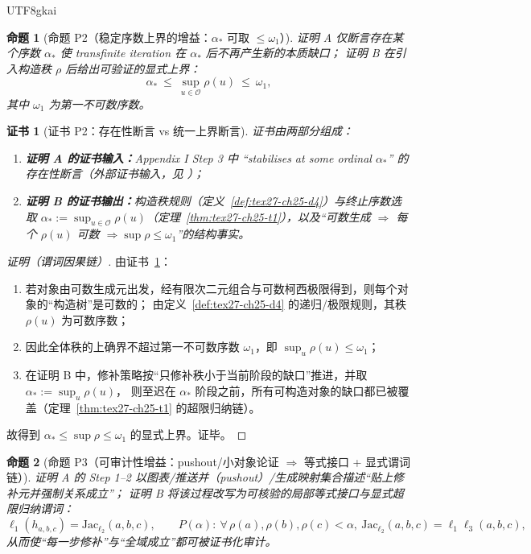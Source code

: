 \documentclass[12pt]{article}
\newtheorem{proposition}{命题}[section]
\newtheorem{Certificate}{证书}[section]
\begin{document}
\begin{CJK*}{UTF8}{gkai}
\begin{proposition}[命题 P2（稳定序数上界的增益：$\alpha_\ast$ 可取 $\le\omega_1$）]
\label{prop:tex27-ch26-p2}
证明 A 仅断言存在某个序数 $\alpha_\ast$ 使 transfinite iteration 在 $\alpha_\ast$ 后不再产生新的本质缺口；
证明 B 在引入构造秩 $\rho$ 后给出可验证的显式上界：
\[
  \alpha_\ast\ \le\ \sup_{u\in\mathcal{O}}\rho(u)\ \le\ \omega_1,
\]
其中 $\omega_1$ 为第一不可数序数。
\end{proposition}

\begin{Certificate}[证书 P2：存在性断言 vs 统一上界断言]
\label{cert:tex27-ch26-p2}
证书由两部分组成：
\begin{enumerate}
  \item \textbf{证明 A 的证书输入：}Appendix I Step 3 中 “stabilises at some ordinal $\alpha_\ast$” 的存在性断言（外部证书输入，见
    \cite{GaoZheng2025GFramework}）；
  \item \textbf{证明 B 的证书输出：}构造秩规则（定义~\ref{def:tex27-ch25-d4}）与终止序数选取
  $\alpha_\ast:=\sup_{u\in\mathcal{O}}\rho(u)$（定理~\ref{thm:tex27-ch25-t1}），以及“可数生成 $\Rightarrow$ 每个 $\rho(u)$ 可数
    $\Rightarrow \sup\rho\le\omega_1$”的结构事实。
\end{enumerate}
\end{Certificate}

\begin{proof}[证明（谓词因果链）]
由证书~\ref{cert:tex27-ch26-p2}：
\begin{enumerate}
  \item 若对象由可数生成元出发，经有限次二元组合与可数柯西极限得到，则每个对象的“构造树”是可数的；
  由定义~\ref{def:tex27-ch25-d4} 的递归/极限规则，其秩 $\rho(u)$ 为可数序数；
  \item 因此全体秩的上确界不超过第一不可数序数 $\omega_1$，即 $\sup_{u}\rho(u)\le\omega_1$；
  \item 在证明 B 中，修补策略按“只修补秩小于当前阶段的缺口”推进，并取 $\alpha_\ast:=\sup_u\rho(u)$，
  则至迟在 $\alpha_\ast$ 阶段之前，所有可构造对象的缺口都已被覆盖（定理~\ref{thm:tex27-ch25-t1} 的超限归纳链）。
\end{enumerate}
故得到 $\alpha_\ast\le \sup\rho\le\omega_1$ 的显式上界。证毕。
\end{proof}

\begin{proposition}[命题 P3（可审计性增益：pushout/小对象论证 $\Rightarrow$ 等式接口 + 显式谓词链）]
\label{prop:tex27-ch26-p3}
证明 A 的 Step 1--2 以图表/推送并（pushout）/生成映射集合描述“贴上修补元并强制关系成立”；
证明 B 将该过程改写为可核验的局部等式接口与显式超限归纳谓词：
\[
  \ell_1(h_{a,b,c})=\mathrm{Jac}_{\ell_2}(a,b,c),
  \qquad
  P(\alpha):\ \forall\,\rho(a),\rho(b),\rho(c)<\alpha,\
  \mathrm{Jac}_{\ell_2}(a,b,c)=\ell_1\ell_3(a,b,c),
\]
从而使“每一步修补”与“全域成立”都可被证书化审计。
\end{proposition}


\end{CJK*}
\end{document}
